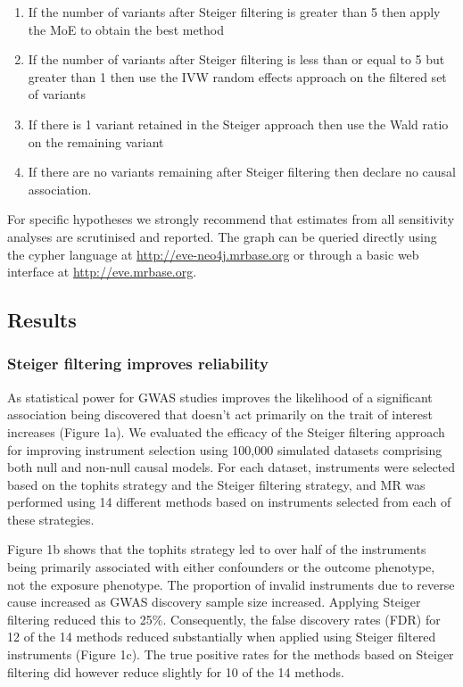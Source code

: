 \documentclass[]{article}
\providecommand{\tightlist}{%
  \setlength{\itemsep}{0pt}\setlength{\parskip}{0pt}}
\begin{document}
\begin{enumerate}
\def\labelenumi{\arabic{enumi}.}
\tightlist
\item
  If the number of variants after Steiger filtering is greater than 5
  then apply the MoE to obtain the best method
\item
  If the number of variants after Steiger filtering is less than or
  equal to 5 but greater than 1 then use the IVW random effects approach
  on the filtered set of variants
\item
  If there is 1 variant retained in the Steiger approach then use the
  Wald ratio on the remaining variant
\item
  If there are no variants remaining after Steiger filtering then
  declare no causal association.
\end{enumerate}

For specific hypotheses we strongly recommend that estimates from all
sensitivity analyses are scrutinised and reported. The graph can be
queried directly using the cypher language at
\url{http://eve-neo4j.mrbase.org} or through a basic web interface at
\url{http://eve.mrbase.org}.

\subsection{Results}\label{results}

\subsubsection{Steiger filtering improves
reliability}\label{steiger-filtering-improves-reliability}

As statistical power for GWAS studies improves the likelihood of a
significant association being discovered that doesn't act primarily on
the trait of interest increases (Figure 1a). We evaluated the efficacy
of the Steiger filtering approach for improving instrument selection
using 100,000 simulated datasets comprising both null and non-null
causal models. For each dataset, instruments were selected based on the
tophits strategy and the Steiger filtering strategy, and MR was
performed using 14 different methods based on instruments selected from
each of these strategies.

Figure 1b shows that the tophits strategy led to over half of the
instruments being primarily associated with either confounders or the
outcome phenotype, not the exposure phenotype. The proportion of invalid
instruments due to reverse cause increased as GWAS discovery sample size
increased. Applying Steiger filtering reduced this to 25\%.
Consequently, the false discovery rates (FDR) for 12 of the 14 methods
reduced substantially when applied using Steiger filtered instruments
(Figure 1c). The true positive rates for the methods based on Steiger
filtering did however reduce slightly for 10 of the 14 methods.
\end{document}
